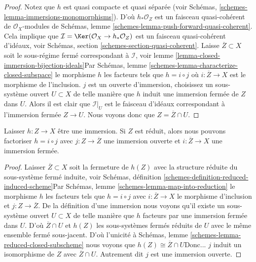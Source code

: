 \begin{proof}

Notez que $h$ est quasi compacte et quasi séparée (voir Schémas, \ref{schemes-lemma-immersions-monomorphisms}). D'où $h_*\mathcal{O}_Z$ est un faisceau quasi-cohérent de $\mathcal{O}_X$-modules de Schémas, lemme \ref{schemes-lemma-push-forward-quasi-coherent}. Cela implique que
$\mathcal{I} = \Ker(\mathcal{O}_X \to h_*\mathcal{O}_Z)$
est un faisceau quasi-cohérent d'idéaux, voir Schémas, section \ref{schemes-section-quasi-coherent}. Laisse $\overline{Z} \subset X$ soit le sous-régime fermé correspondant à $\mathcal{I}$, voir lemme \ref{lemma-closed-immersion-bijection-ideals}Par Schémas, lemme \ref{schemes-lemma-characterize-closed-subspace}
le morphisme $h$ les facteurs tels que
$h = i \circ j$ où $i : \overline{Z} \to X$ est le morphisme de l'inclusion. $j$ est un ouverte d'immersion, choisissez un sous-système ouvert
$U \subset X$ de telle manière que $h$ induit une immersion fermée de $Z$
dans $U$. Alors il est clair que $\mathcal{I}|_U$ est le faisceau d'idéaux correspondant à l'immersion fermée $Z \to U$. Nous voyons donc que $Z = \overline{Z} \cap U$.

\end{proof}

\begin{lemma}

\label{lemma-factor-reduced-immersion}

Laisser $h : Z \to X$ être une immersion. Si $Z$ est réduit, alors nous pouvons factoriser
$h = i \circ j$ avec $j : Z \to \overline{Z}$ une immersion ouverte et $i : \overline{Z} \to X$ une immersion fermée.

\end{lemma}

\begin{proof}

Laisser $\overline{Z} \subset X$ soit la fermeture de $h(Z)$ avec la structure réduite du sous-système fermé induite, voir Schémas, définition \ref{schemes-definition-reduced-induced-scheme}Par Schémas, lemme \ref{schemes-lemma-map-into-reduction}
le morphisme $h$ les facteurs tels que
$h = i \circ j$ avec $i : \overline{Z} \to X$ le morphisme d'inclusion et $j : Z \to \overline{Z}$. De la définition d'une immersion nous voyons qu'il existe un sous-système ouvert $U \subset X$ de telle manière que
$h$ facteurs par une immersion fermée dans $U$. D'où
$\overline{Z} \cap U$ et $h(Z)$ les sous-systèmes fermés réduits de $U$ avec le même ensemble fermé sous-jacent. D'où l'unicité à Schémas, lemme \ref{schemes-lemma-reduced-closed-subscheme}
nous voyons que $h(Z) \cong \overline{Z} \cap U$Donc... $j$ induit un isomorphisme de $Z$ avec $\overline{Z} \cap U$. Autrement dit $j$ est une immersion ouverte.

\end{proof}



